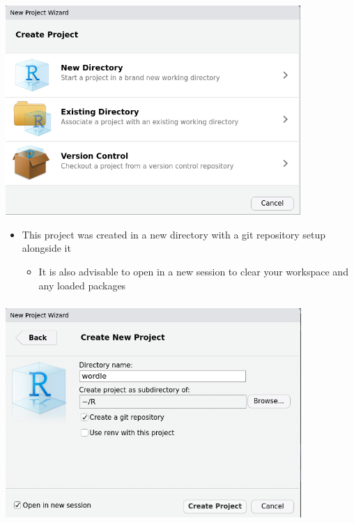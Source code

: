 \documentclass[
]{article}
\providecommand{\tightlist}{%
  \setlength{\itemsep}{0pt}\setlength{\parskip}{0pt}}
\begin{document}
\includegraphics[width=4.40625in,height=\textheight]{images/create_project.png}

\begin{itemize}
\item
  This project was created in a new directory with a git repository
  setup alongside it

  \begin{itemize}
  \tightlist
  \item
    It is also advisable to open in a new session to clear your
    workspace and any loaded packages
  \end{itemize}
\end{itemize}

\hypertarget{section}{%
\subsubsection{\texorpdfstring{\protect\includegraphics[width=4.41667in,height=\textheight]{images/project_settings.png}}{}}\label{section}}
\end{document}
